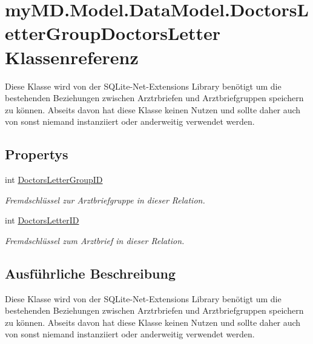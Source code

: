\hypertarget{classmy_m_d_1_1_model_1_1_data_model_1_1_doctors_letter_group_doctors_letter}{}\section{my\+M\+D.\+Model.\+Data\+Model.\+Doctors\+Letter\+Group\+Doctors\+Letter Klassenreferenz}
\label{classmy_m_d_1_1_model_1_1_data_model_1_1_doctors_letter_group_doctors_letter}


Diese Klasse wird von der S\+Q\+Lite-\/\+Net-\/\+Extensions Library benötigt um die bestehenden Beziehungen zwischen Arztrbriefen und Arztbriefgruppen speichern zu können. Abseits davon hat diese Klasse keinen Nutzen und sollte daher auch von sonst niemand instanziiert oder anderweitig verwendet werden.  


\subsection*{Propertys}
\begin{DoxyCompactItemize}
\item 
int \mbox{\hyperlink{classmy_m_d_1_1_model_1_1_data_model_1_1_doctors_letter_group_doctors_letter_a72d46cc74b5a18580b6fd38347463689}{Doctors\+Letter\+Group\+ID}}
\begin{DoxyCompactList}\small\item\em Fremdschlüssel zur Arztbriefgruppe in dieser Relation. \end{DoxyCompactList}\item 
int \mbox{\hyperlink{classmy_m_d_1_1_model_1_1_data_model_1_1_doctors_letter_group_doctors_letter_a9ab739570b1ed8e567f199de0370bc3d}{Doctors\+Letter\+ID}}
\begin{DoxyCompactList}\small\item\em Fremdschlüssel zum Arztbrief in dieser Relation. \end{DoxyCompactList}\end{DoxyCompactItemize}


\subsection{Ausführliche Beschreibung}
Diese Klasse wird von der S\+Q\+Lite-\/\+Net-\/\+Extensions Library benötigt um die bestehenden Beziehungen zwischen Arztrbriefen und Arztbriefgruppen speichern zu können. Abseits davon hat diese Klasse keinen Nutzen und sollte daher auch von sonst niemand instanziiert oder anderweitig verwendet werden. 



